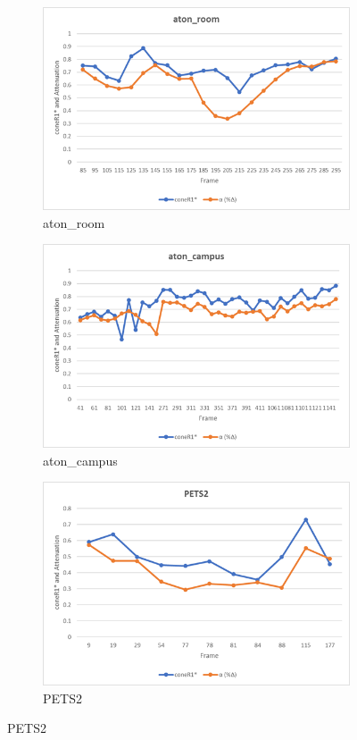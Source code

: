 \begin{figure}
  \centering
  \begin{subfigure}{1\linewidth}
  \includegraphics[width=1\linewidth]{figures/room_rgb_corr.jpg}
  \caption{aton\_room}
\end{subfigure}
\hfill
\begin{subfigure}{.49\linewidth}
  \includegraphics[width=1\linewidth]{figures/campus_rgb_corr.jpg}
  \caption{aton\_campus}
\end{subfigure}
\begin{subfigure}{.49\linewidth}
  \includegraphics[width=1\linewidth]{figures/pets2_rgb_corr.jpg}
  \caption{PETS2}
\end{subfigure}


\end{figure}
